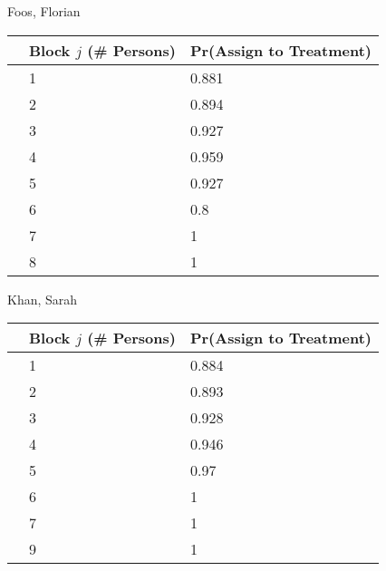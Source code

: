 \documentclass[11pt,notitlepage]{article}
\begin{document}
\begin{table}[h!]
\begin{center}
\begin{minipage}[t]{0.45\linewidth}\centering

Foos, Florian

\begin{tabular}{rll}
  \hline
 & Block $j$ (\# Persons) & Pr(Assign to Treatment) \\ 
  \hline
  & 1 & 0.881 \\ 
  & 2 & 0.894 \\ 
  & 3 & 0.927 \\ 
  & 4 & 0.959 \\ 
  & 5 & 0.927 \\ 
  & 6 & 0.8 \\ 
  & 7 & 1 \\ 
  & 8 & 1 \\ 
   \hline
\end{tabular}
\end{minipage}
\hspace{0.5cm}
\begin{minipage}[t]{0.45\linewidth}\centering

Khan, Sarah

\begin{tabular}{rll}
  \hline
 & Block $j$ (\# Persons) & Pr(Assign to Treatment) \\ 
  \hline
 & 1 & 0.884 \\ 
 & 2 & 0.893 \\ 
 & 3 & 0.928 \\ 
 & 4 & 0.946 \\ 
 & 5 & 0.97 \\ 
 & 6 & 1 \\ 
 & 7 & 1 \\ 
 & 9 & 1 \\ 
   \hline
\end{tabular}

\end{minipage}

\end{center}
\end{table}


\clearpage
\end{document}
